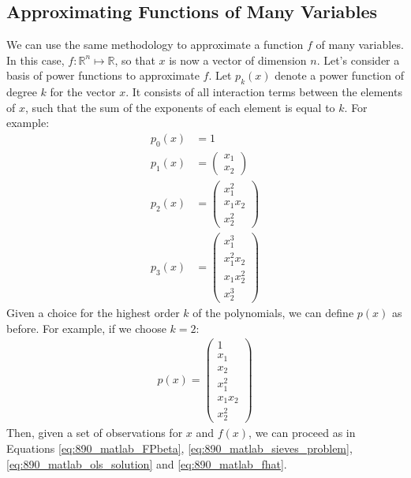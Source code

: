\documentclass[12pt, a4paper]{article}
\begin{document}
\subsection{Approximating Functions of Many Variables}
\label{sec:org094c394}
We can use the same methodology to approximate a function \(f\) of many variables.
In this case, \(f:\mathbb{R}^n\mapsto\mathbb{R}\), so that \(x\) is now a vector of dimension \(n\).
Let's consider a basis of power functions to approximate \(f\).
Let \(p_k(x)\) denote a power function of degree \(k\) for the vector \(x\).
It consists of all interaction terms between the elements of \(x\), such that the sum of the exponents of each element is equal to \(k\).
For example:
\begin{align*}
p_0(x) &= 1\\
p_1(x) &= \begin{pmatrix}
x_1\\
x_2
\end{pmatrix}\\
p_2(x) &= \begin{pmatrix}
x_1^2\\
x_1x_2\\
x_2^2
\end{pmatrix}\\
p_3(x) &= \begin{pmatrix}
x_1^3\\
x_1^2x_2\\
x_1x_2^2\\
x_2^3
\end{pmatrix}
\end{align*}
Given a choice for the highest order \(k\) of the polynomials, we can define \(p(x)\) as before.
For example, if we choose \(k=2\):
\begin{align*}
  p(x)=\begin{pmatrix}
    1\\
    x_1\\
    x_2\\
    x_1^2\\
    x_1x_2\\
    x_2^2
  \end{pmatrix}
\end{align*}
Then, given a set of observations for \(x\) and \(f(x)\), we can proceed as in Equations \ref{eq:890_matlab_FPbeta}, \ref{eq:890_matlab_sieves_problem}, \ref{eq:890_matlab_ols_solution} and \ref{eq:890_matlab_fhat}.
\end{document}
